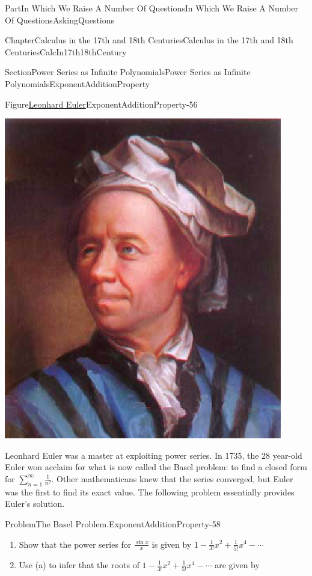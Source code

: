 \documentclass[oneside,10pt,]{book}
\numberwithin{equation}{part}
\begin{document}
\begin{partptx}{Part}{In Which We Raise A Number Of Questions}{}{In Which We Raise A Number Of Questions}{}{}{AskingQuestions}
\begin{chapterptx}{Chapter}{Calculus in the 17th and 18th Centuries}{}{Calculus in the 17th and 18th Centuries}{}{}{CalcIn17th18thCentury}
\begin{sectionptx}{Section}{Power Series as Infinite Polynomials}{}{Power Series as Infinite Polynomials}{}{}{ExponentAdditionProperty}
\begin{figureptx}{Figure}{\href{https://mathshistory.st-andrews.ac.uk/Biographies/Euler/}{Leonhard Euler}\protect\footnotemark{}}{ExponentAdditionProperty-56}{}
\begin{image}{0.325}{0.35}{0.325}{}
\includegraphics[width=\linewidth]{external/images/Euler.png}
\end{image}%
\tcblower
\end{figureptx}%
%
Leonhard Euler was a master at exploiting power series.  In 1735, the 28 year-old Euler won acclaim for what is now called the Basel problem: to find a closed form for \(\sum_{n=1}^\infty\frac{1}{n^2}\).  Other mathematicans knew that the series converged, but Euler was the first to find its exact value.  The following problem essentially provides Euler's solution.%
\begin{problem}{Problem}{The Basel Problem.}{ExponentAdditionProperty-58}%
\begin{enumerate}[font=\bfseries,label=(\alph*),ref=\alph*]%
\item{}Show that the power series for \(\frac{\sin x}{x}\) is given by \(1-\frac{1}{3!}x^2+\frac{1}{5!}x^4-\cdots\)%
\item{}Use (a) to infer that the roots of \(1-\frac{1}{3!}x^2+\frac{1}{5!}x^4-\cdots\) are given by%
\begin{equation*}

\end{equation*}
\end{enumerate}
\end{problem}
\end{sectionptx}
\end{chapterptx}
\end{partptx}
\end{document}
